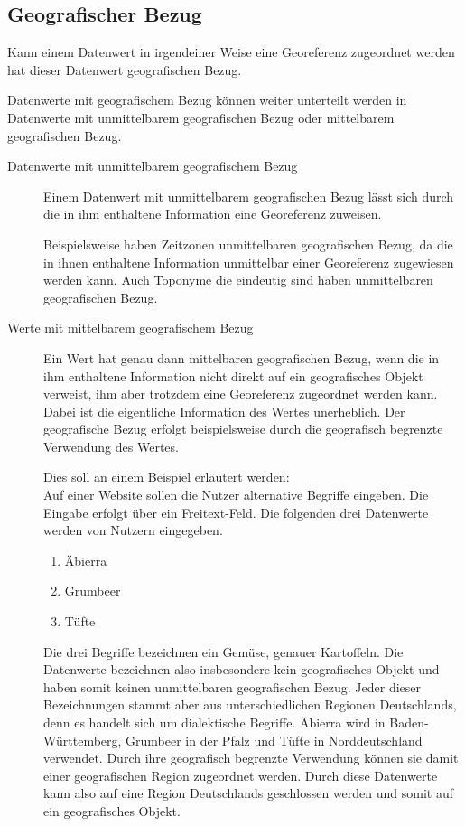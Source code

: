 		\subsection{Geografischer Bezug} 

			Kann einem Datenwert in irgendeiner Weise eine Georeferenz zugeordnet werden hat dieser Datenwert geografischen Bezug.

			Datenwerte mit geografischem Bezug können weiter unterteilt werden in Datenwerte mit unmittelbarem geografischen Bezug oder mittelbarem geografischen Bezug. 

			\begin{description}
				\item[Datenwerte mit unmittelbarem geografischem Bezug]

					Einem Datenwert mit unmittelbarem geografischen Bezug lässt sich durch die in ihm enthaltene Information eine Georeferenz zuweisen.	

					Beispielsweise haben Zeitzonen unmittelbaren geografischen Bezug, da die in ihnen enthaltene Information unmittelbar einer Georeferenz zugewiesen werden kann.
					Auch Toponyme die eindeutig sind haben unmittelbaren geografischen Bezug.

				\item[Werte mit mittelbarem geografischem Bezug] 

					Ein Wert hat genau dann mittelbaren geografischen Bezug, wenn die in ihm enthaltene Information nicht direkt auf ein geografisches Objekt verweist, ihm aber trotzdem eine Georeferenz zugeordnet werden kann.
					Dabei ist die eigentliche Information des Wertes unerheblich. 
					Der geografische Bezug erfolgt beispielsweise durch die geografisch begrenzte Verwendung des Wertes. 

					Dies soll an einem Beispiel erläutert werden:\\
					Auf einer Website sollen die Nutzer alternative Begriffe eingeben.
					Die Eingabe erfolgt über ein Freitext-Feld. 
					Die folgenden drei Datenwerte werden von Nutzern eingegeben.

					\begin{enumerate}
					 	\item Äbierra
					 	\item Grumbeer
					 	\item Tüfte 
					 \end{enumerate} 

					Die drei Begriffe bezeichnen ein Gemüse, genauer Kartoffeln.
					Die Datenwerte bezeichnen also insbesondere kein geografisches Objekt und haben somit keinen unmittelbaren geografischen Bezug.
					Jeder dieser Bezeichnungen stammt aber aus unterschiedlichen Regionen Deutschlands, denn es handelt sich um dialektische Begriffe.
					Äbierra wird in Baden-Württemberg, Grumbeer in der Pfalz und Tüfte in Norddeutschland verwendet.
					Durch ihre geografisch begrenzte Verwendung können sie damit einer geografischen Region zugeordnet werden.
					Durch diese Datenwerte kann also auf eine Region Deutschlands geschlossen werden und somit auf ein geografisches Objekt.

			\end{description}

